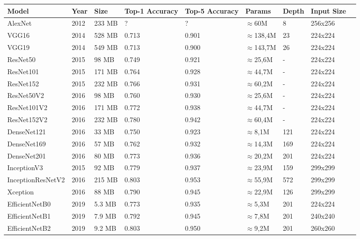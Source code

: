 \begin{table}[h]
    \centering
    \begin{tabularx}{\textwidth}{|l|X|X|X|X|X|X|X|X|}
        \hline
        Model & Year & Size & Top-1 Accuracy & Top-5 Accuracy & Params & Depth & Input Size \\ \hline
        AlexNet & 2012 & 233 MB & ? & ? & $\approx$60M & 8 & 256x256 \\ \hline
    	VGG16 & 2014 & 528 MB & 0.713 & 0.901 & $\approx$138,4M & 23 & 224x224 \\ \hline
    	VGG19 & 2014 & 549 MB & 0.713 & 0.900 & $\approx$143,7M & 26 & 224x224 \\ \hline
    	ResNet50 & 2015 & 98 MB & 0.749 & 0.921 & $\approx$25,6M & - & 224x224 \\ \hline
    	ResNet101 & 2015 & 171 MB & 0.764 & 0.928 & $\approx$44,7M & - & 224x224 \\ \hline
    	ResNet152 & 2015 & 232 MB & 0.766 & 0.931 & $\approx$60,2M & - & 224x224 \\ \hline
    	ResNet50V2 & 2016 & 98 MB & 0.760 & 0.930 & $\approx$25,6M & - & 224x224 \\ \hline
    	ResNet101V2 & 2016 & 171 MB & 0.772 & 0.938 & $\approx$44,7M & - & 224x224 \\ \hline
    	ResNet152V2 & 2016 & 232 MB & 0.780 & 0.942 & $\approx$60,4M & - & 224x224 \\ \hline
        DenseNet121 & 2016 & 33 MB & 0.750 & 0.923 & $\approx$8,1M & 121 & 224x224 \\ \hline
    	DenseNet169 & 2016 & 57 MB & 0.762 & 0.932 & $\approx$14,3M & 169 & 224x224 \\ \hline
    	DenseNet201 & 2016 & 80 MB & 0.773 & 0.936 & $\approx$20,2M & 201 & 224x224 \\ \hline
    	InceptionV3 & 2015 & 92 MB & 0.779 & 0.937 & $\approx$23,9M & 159 & 299x299 \\ \hline
    	InceptionResNetV2 & 2016 & 215 MB & 0.803 & 0.953 & $\approx$55,9M & 572 & 299x299 \\ \hline
     	Xception & 2016 & 88 MB & 0.790 & 0.945 & $\approx$22,9M & 126 & 299x299 \\ \hline
    	EfficientNetB0 & 2019 & 5.3 MB & 0.773 & 0.935 & $\approx$5,3M & 201 & 224x224 \\ \hline
    	EfficientNetB1 & 2019 & 7.9 MB & 0.792 & 0.945 & $\approx$7,8M & 201 & 240x240 \\ \hline
    	EfficientNetB2 & 2019 & 9.2 MB & 0.803 & 0.950 & $\approx$9,2M & 201 & 260x260 \\ \hline

\end{tabularx}
\end{table}
